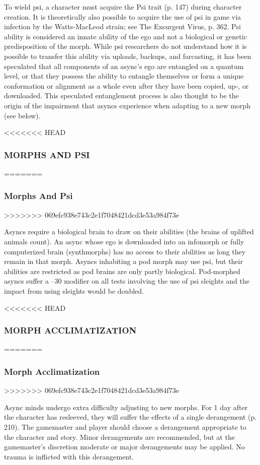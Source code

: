 To wield psi, a character must acquire the Psi trait (p. 147) during character creation. It is theoretically also possible to acquire the use of psi in game via infection by the Watts-MacLeod strain; see The Exsurgent Virus, p. 362. Psi ability is considered an innate ability of the ego and not a biological or genetic predisposition of the morph. While psi researchers do not understand how it is possible to transfer this ability via uploads, backups, and farcasting, it has been speculated that all components of an async’s ego are entangled on a quantum level, or that they possess the ability to entangle themselves or form a unique conformation or alignment as a whole even after they have been copied, up-, or downloaded. This speculated entanglement process is also thought to be the origin of the impairment that asyncs experience when adapting to a new morph (see below). 

<<<<<<< HEAD \subsubsection{MORPHS AND PSI} ======= \subsubsection{Morphs And Psi} >>>>>>> 069efc938e743c2e1f7048421dcd3e53a984f73e 

Asyncs require a biological brain to draw on their abilities (the brains of uplifted animals count). An async whose ego is downloaded into an infomorph or fully computerized brain (synthmorphs) has no access to their abilities as long they remain in that morph. Asyncs inhabiting a pod morph may use psi, but their abilities are restricted as pod brains are only partly biological. Pod-morphed asyncs suffer a –30 modifier on all tests involving the use of psi sleights and the impact from using sleights would be doubled. 

<<<<<<< HEAD \subsubsection{MORPH ACCLIMATIZATION} ======= \subsubsection{Morph Acclimatization} >>>>>>> 069efc938e743c2e1f7048421dcd3e53a984f73e 

Async minds undergo extra difficulty adjusting to new morphs. For 1 day after the character has resleeved, they will suffer the effects of a single derangement (p. 210). The gamemaster and player should choose a derangement appropriate to the character and story. Minor derangements are recommended, but at the gamemaster’s discretion moderate or major derangements may be applied. No trauma is inflicted with this derangement. 

